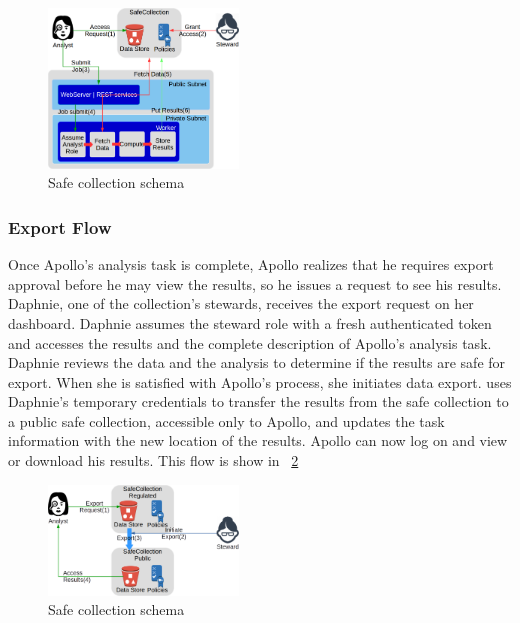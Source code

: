 \begin{figure}
  \center
  \includegraphics[width=0.45\textwidth]{figures/safe_flow.png}
  \caption{Safe collection schema}
  \label{fig:flow1}
  \vspace{-1.5em}
\end{figure}


\subsubsection{Export Flow}

Once Apollo's analysis task is complete, Apollo realizes that he requires export approval before he may view the
results, so he issues a request to see his results. Daphnie, one of the collection's stewards, receives
the export request on her dashboard. Daphnie assumes
the steward role with a fresh authenticated token and accesses the results and the complete description
of Apollo's analysis task. Daphnie reviews the data and the analysis to determine if the results are
safe for export. When she is satisfied with Apollo's process, she initiates data export. \NAME
uses Daphnie's temporary credentials to transfer the results from the safe collection to a public
safe collection, accessible only to Apollo, and updates the task information with the new location of the results. Apollo can now log on
and view or download his results. This flow is show in \figurename~\ref{fig:flow2}

\begin{figure}
  \center
  \includegraphics[width=0.45\textwidth]{figures/export_flow.png}
  \caption{Safe collection schema}
  \label{fig:flow2}
  \vspace{-1.5em}
\end{figure}


